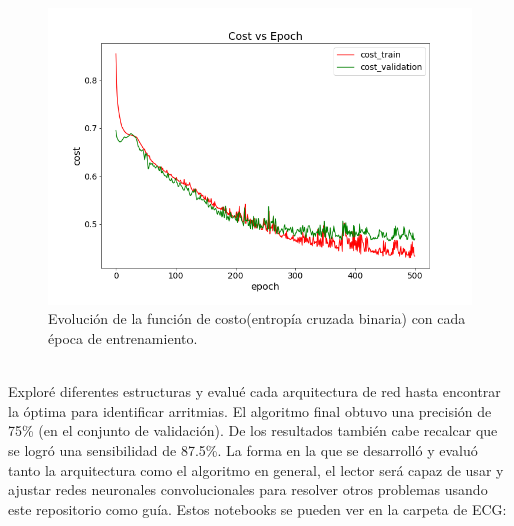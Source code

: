 \documentclass[11pt,letterpaper]{article}
\begin{document}
\begin{flushleft}
\begin{figure}[H]
\begin{minipage}{.48\linewidth}
\label{arq}
\end{minipage}
\hfill
\begin{minipage}{.48\linewidth}
\includegraphics[width=\linewidth]{Build.png} 
\vspace{-0,8cm}
\caption{\footnotesize{Evolución de la función de costo(entropía cruzada binaria) con cada época de entrenamiento.}}
\label{build}
\end{minipage}
\end{figure}
\hfill 
\\Exploré diferentes estructuras y evalué cada arquitectura de red hasta encontrar la óptima para identificar arritmias. El algoritmo final obtuvo una precisión de 75\% (en el conjunto de validación). De los resultados también cabe recalcar que se logró una sensibilidad de 87.5\%. La forma en la que se desarrolló y evaluó tanto la arquitectura como el algoritmo en general, el lector será capaz de usar y ajustar redes neuronales convolucionales para resolver otros problemas usando este repositorio como guía. Estos notebooks se pueden ver en la carpeta de ECG: \href{https://github.com/Javi-ciencias/Servicio_social/tree/main/ECG/Code}\\
\hfill \\


\end{flushleft}
\end{document}
